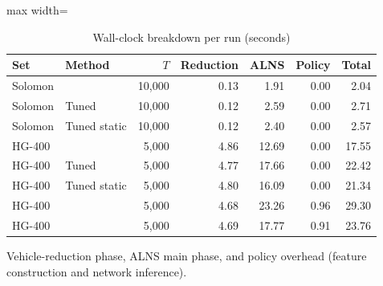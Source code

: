 \begin{table}[t]
\centering
\caption{Wall-clock breakdown per run (seconds)}\label{tab:timing}
\setlength{\tabcolsep}{3pt}
\begin{adjustbox}{max width=\linewidth}
\begin{tabular}{llrrrrr}
\toprule
Set & Method & $T$ & Reduction & ALNS & Policy & Total\\ \midrule
Solomon & \Rw{} & 10,000 & 0.13 & 1.91 & 0.00 & 2.04\\
Solomon & Tuned \Rw{} & 10,000 & 0.12 & 2.59 & 0.00 & 2.71\\
Solomon & Tuned static & 10,000 & 0.12 & 2.40 & 0.00 & 2.57\\
HG-400 & \Rw{} & 5,000 & 4.86 & 12.69 & 0.00 & 17.55\\
HG-400 & Tuned \Rw{} & 5,000 & 4.77 & 17.66 & 0.00 & 22.42\\
HG-400 & Tuned static & 5,000 & 4.80 & 16.09 & 0.00 & 21.34\\
HG-400 & \sgalns{} & 5,000 & 4.68 & 23.26 & 0.96 & 29.30\\
HG-400 & \sgc{} & 5,000 & 4.69 & 17.77 & 0.91 & 23.76\\
\bottomrule
\end{tabular}
\end{adjustbox}
\par\vspace{2pt}\parbox{\linewidth}{\footnotesize Vehicle-reduction phase, ALNS main phase, and policy overhead (feature construction and network inference).}
\end{table}
